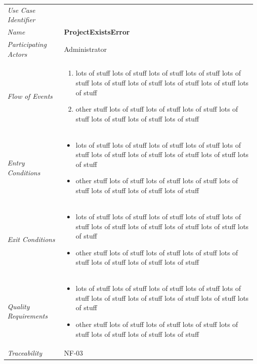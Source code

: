 \documentclass[12pt,letterpaper]{article}
\begin{document}
\begin{center}
	\begin{tabu} to 
		\toprule
		Use Case Identifier & \projectexistserror{} \\
		Name & {\bf ProjectExistsError} \\
		Participating Actors & Administrator \\
		Flow of Events & 
	    \begin{enumerate}[topsep=-1em]
		    \item lots of stuff lots of stuff lots of stuff lots of stuff lots of stuff lots of stuff lots of stuff lots of stuff lots of stuff lots of stuff
		    \item other stuff lots of stuff lots of stuff lots of stuff lots of stuff lots of stuff lots of stuff lots of stuff
		\end{enumerate} \\

		Entry Conditions &
		\begin{itemize}[topsep=-1em]
		    \item lots of stuff lots of stuff lots of stuff lots of stuff lots of stuff lots of stuff lots of stuff lots of stuff lots of stuff lots of stuff
		    \item other stuff lots of stuff lots of stuff lots of stuff lots of stuff lots of stuff lots of stuff lots of stuff
        \end{itemize} \\

		Exit Conditions &
		\begin{itemize}[topsep=-1em]
		    \item lots of stuff lots of stuff lots of stuff lots of stuff lots of stuff lots of stuff lots of stuff lots of stuff lots of stuff lots of stuff
		    \item other stuff lots of stuff lots of stuff lots of stuff lots of stuff lots of stuff lots of stuff lots of stuff
        \end{itemize} \\

		Quality Requirements &
		\begin{itemize}[topsep=-1em]
		    \item lots of stuff lots of stuff lots of stuff lots of stuff lots of stuff lots of stuff lots of stuff lots of stuff lots of stuff lots of stuff
		    \item other stuff lots of stuff lots of stuff lots of stuff lots of stuff lots of stuff lots of stuff lots of stuff
        \end{itemize} \\

		Traceability & NF-03 \\
		\toprule
	\end{tabu}
\end{center}
\end{document}
